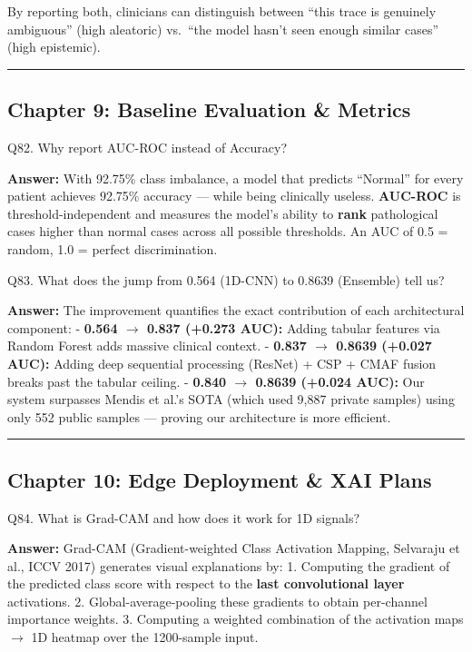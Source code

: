 \documentclass[11pt,a4paper]{article}
\begin{document}
By reporting both, clinicians can distinguish between ``this trace is
genuinely ambiguous'' (high aleatoric) vs.~``the model hasn't seen
enough similar cases'' (high epistemic).

\begin{center}\rule{0.5\linewidth}{0.5pt}\end{center}

\subsection{Chapter 9: Baseline Evaluation \&
Metrics}\label{chapter-9-baseline-evaluation-metrics}

\begin{questionbox}
Q82. Why report AUC-ROC instead of Accuracy?
\end{questionbox}
\textbf{Answer:} With 92.75\% class imbalance, a model that predicts
``Normal'' for every patient achieves 92.75\% accuracy --- while being
clinically useless. \textbf{AUC-ROC} is threshold-independent and
measures the model's ability to \textbf{rank} pathological cases higher
than normal cases across all possible thresholds. An AUC of 0.5 =
random, 1.0 = perfect discrimination.

\begin{questionbox}
Q83. What does the jump from 0.564 (1D-CNN) to 0.8639 (Ensemble)
tell us?
\end{questionbox}
\textbf{Answer:} The improvement quantifies the exact contribution of each
architectural component: - \textbf{0.564 $\rightarrow$ 0.837 (+0.273 AUC):} Adding
tabular features via Random Forest adds massive clinical context. -
\textbf{0.837 $\rightarrow$ 0.8639 (+0.027 AUC):} Adding deep sequential processing
(ResNet) + CSP + CMAF fusion breaks past the tabular ceiling. -
\textbf{0.840 $\rightarrow$ 0.8639 (+0.024 AUC):} Our system surpasses Mendis et
al.'s SOTA (which used 9,887 private samples) using only 552 public
samples --- proving our architecture is more efficient.

\begin{center}\rule{0.5\linewidth}{0.5pt}\end{center}

\subsection{Chapter 10: Edge Deployment \& XAI
Plans}\label{chapter-10-edge-deployment-xai-plans}

\begin{questionbox}
Q84. What is Grad-CAM and how does it work for 1D signals?
\end{questionbox}
\textbf{Answer:} Grad-CAM (Gradient-weighted Class Activation Mapping,
Selvaraju et al., ICCV 2017) generates visual explanations by: 1.
Computing the gradient of the predicted class score with respect to the
\textbf{last convolutional layer} activations. 2. Global-average-pooling
these gradients to obtain per-channel importance weights. 3. Computing a
weighted combination of the activation maps $\rightarrow$ 1D heatmap over the
1200-sample input.
\end{document}
